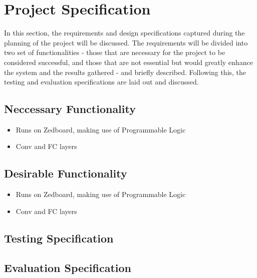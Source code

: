 \documentclass[12pt]{article}
\begin{document}
\section{Project Specification}
\label{sec:ProjSpec}
\vspace{-12pt}

In this section, the requirements and design specifications captured during the planning of the project will be discussed. The requirements will be divided into two set of functionalities - those that are necessary for the project to be considered successful, and those that are not essential but would greatly enhance the system and the results gathered - and briefly described. Following this, the testing and evaluation specifications are laid out and discussed.

\subsection{Neccessary Functionality}
\label{ProjSpec-Neccessary}
\vspace{-12pt}

\begin{itemize}
\item Runs on Zedboard, making use of Programmable Logic
\item Conv and FC layers
\end{itemize}

\subsection{Desirable Functionality}
\label{ProjSpec-Desirable}
\vspace{-12pt}

\begin{itemize}
\item Runs on Zedboard, making use of Programmable Logic
\item Conv and FC layers
\end{itemize}

\subsection{Testing Specification}
\label{ProjSpec-TestSpec}
\vspace{-12pt}

\subsection{Evaluation Specification}
\label{ProjSpec-EvalSpec}
\vspace{-12pt}
\end{document}
